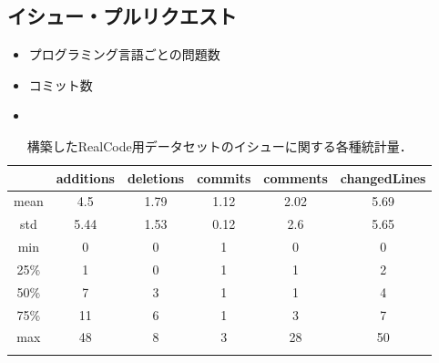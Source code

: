 \subsection{イシュー・プルリクエスト}

\begin{itemize}
    \item プログラミング言語ごとの問題数
    \item コミット数
    \item 
\end{itemize}

\begin{table}[t]

  \centering
  \caption{構築したRealCode用データセットのイシューに関する各種統計量．}
  \label{table:stats_repos}
    
  \begin{tabular}{c || c | c | c | c | c } \Xhline{3\arrayrulewidth}
        & additions & deletions & commits & comments & changedLines \\ \hline \hline
    mean & 4.5 & 1.79 & 1.12 & 2.02 & 5.69 \\
    std & 5.44 & 1.53 & 0.12 & 2.6 & 5.65 \\
    min & 0 & 0 & 1 & 0 & 0 \\
    25\% & 1 & 0 & 1 & 1 & 2 \\
    50\% & 7 & 3 & 1 & 1 & 4 \\
    75\% & 11 & 6 & 1 & 3 & 7 \\
    max & 48 & 8 & 3 & 28 & 50 \\
    
    \Xhline{3\arrayrulewidth}
\end{tabular}
\end{table}


